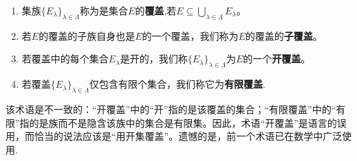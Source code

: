 \documentclass[lang=cn,newtx,10pt,scheme=chinese]{../Template/elegantbook}
\begin{document}
\begin{definition}[覆盖]\label{definition:覆盖}
\begin{enumerate}
  \item 集族\(\{E_{\lambda}\}_{\lambda\in\Lambda}\)称为是集合\(E\)的\textbf{覆盖},若\(E\subseteq\bigcup_{\lambda\in\Lambda}E_{\lambda}\)。
  
  \item 若\(E\)的覆盖的子族自身也是\(E\)的一个覆盖，我们称为\(E\)的覆盖的\textbf{子覆盖}。
  
  \item 若覆盖中的每个集合\(E_{\lambda}\)是开的，我们称\(\{E_{\lambda}\}_{\lambda\in\Lambda}\)为\(E\)的一个\textbf{开覆盖}。
  
  \item 若覆盖\(\{E_{\lambda}\}_{\lambda\in\Lambda}\)仅包含有限个集合，我们称它为\textbf{有限覆盖}.
\end{enumerate} 
\end{definition}
\begin{note}
  该术语是不一致的：“开覆盖”中的“开”指的是该覆盖的集合；“有限覆盖”中的“有限”指的是族而不是隐含该族中的集合是有限集。因此，术语“开覆盖”是语言的误用，而恰当的说法应该是“用开集覆盖”。遗憾的是，前一个术语已在数学中广泛使用.
\end{note}
\end{document}
